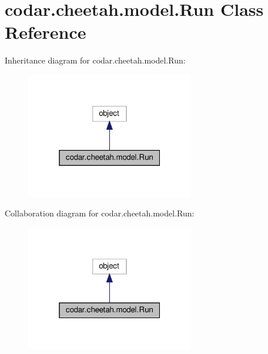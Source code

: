 \hypertarget{classcodar_1_1cheetah_1_1model_1_1_run}{}\section{codar.\+cheetah.\+model.\+Run Class Reference}
\label{classcodar_1_1cheetah_1_1model_1_1_run}


Inheritance diagram for codar.\+cheetah.\+model.\+Run\+:
\nopagebreak
\begin{figure}[H]
\begin{center}
\leavevmode
\includegraphics[width=208pt]{classcodar_1_1cheetah_1_1model_1_1_run__inherit__graph}
\end{center}
\end{figure}


Collaboration diagram for codar.\+cheetah.\+model.\+Run\+:
\nopagebreak
\begin{figure}[H]
\begin{center}
\leavevmode
\includegraphics[width=208pt]{classcodar_1_1cheetah_1_1model_1_1_run__coll__graph}
\end{center}
\end{figure}
